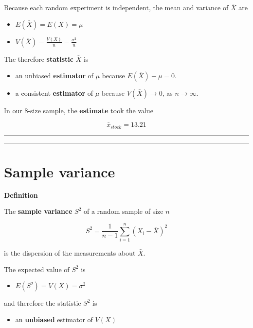 \documentclass[
]{book}
\providecommand{\tightlist}{%
  \setlength{\itemsep}{0pt}\setlength{\parskip}{0pt}}
\begin{document}
Because each random experiment is independent, the mean and variance of \(\bar{X}\) are

\begin{itemize}
\tightlist
\item
  \(E(\bar{X})=E(X)=\mu\)
\item
  \(V(\bar{X})=\frac{V(X)}{n}=\frac{\sigma^2}{n}\)
\end{itemize}

The therefore \textbf{statistic} \(\bar{X}\) is

\begin{itemize}
\tightlist
\item
  an unbiased \textbf{estimator} of \(\mu\) because \(E(\bar{X})-\mu=0\).
\item
  a consistent \textbf{estimator} of \(\mu\) because \(V(\bar{X}) \rightarrow 0\), as \(n \rightarrow \infty\).
\end{itemize}

In our \(8\)-size sample, the \textbf{estimate} took the value

\[\bar{x}_{stock}=13.21\]

\begin{center}\rule{0.5\linewidth}{0.5pt}\end{center}

\begin{center}\rule{0.5\linewidth}{0.5pt}\end{center}

\hypertarget{sample-variance-2}{%
\section{Sample variance}\label{sample-variance-2}}

\textbf{Definition}

The \textbf{sample variance} \(S^2\) of a random sample of size \(n\)

\[S^2= \frac{1}{n-1}\sum_{i=1}^n (X_i-\bar{X})^2\]

is the dispersion of the measurements about \(\bar{X}\).

The expected value of \(S^2\) is

\begin{itemize}
\tightlist
\item
  \(E(S^2)=V(X)=\sigma^2\)
\end{itemize}

and therefore the statistic \(S^2\) is

\begin{itemize}
\tightlist
\item
  an \textbf{unbiased} estimator of \(V(X)\)
\end{itemize}
\end{document}
